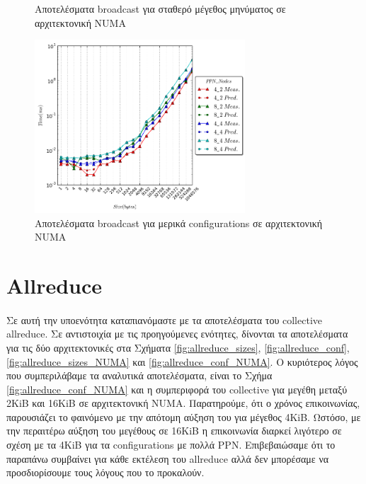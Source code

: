 \begin{figure}[H]
    \caption{Αποτελέσματα broadcast για σταθερό μέγεθος μηνύματος σε αρχιτεκτονική NUMA}
        \label{fig:bcast_sizes_NUMA}
\end{figure}
\begin{figure}[ht]
    \centering
     \captionsetup{justification=centering,margin=0cm,font=footnotesize}
    \includegraphics[width=0.7\textwidth]{./images/broadcast_NUMA/bcast.png}
    \caption{Αποτελέσματα broadcast για μερικά configurations σε αρχιτεκτονική NUMA}
    \label{fig:bcast_conf_NUMA}
\end{figure}

\section{Αllreduce}
\paragraph{}
Σε αυτή την υποενότητα καταπιανόμαστε με τα αποτελέσματα του  collective allreduce. Σε αντιστοιχία με τις προηγούμενες ενότητες, δίνονται τα αποτελέσματα για τις δύο αρχιτεκτονικές στα Σχήματα \ref{fig:allreduce_sizes}, \ref{fig:allreduce_conf}, \ref{fig:allreduce_sizes_NUMA} και \ref{fig:allreduce_conf_NUMA}. Ο κυριότερος λόγος που συμπεριλάβαμε τα αναλυτικά αποτελέσματα, είναι το Σχήμα \ref{fig:allreduce_conf_NUMA} και η συμπεριφορά του collective για μεγέθη μεταξύ 2KiB και 16KiB σε αρχιτεκτονική NUMA. Παρατηρούμε, ότι ο χρόνος επικοινωνίας, παρουσιάζει το φαινόμενο με την απότομη αύξηση του για μέγεθος 4KiB. Ωστόσο, με την περαιτέρω αύξηση του μεγέθους σε 16KiB η επικοινωνία διαρκεί λιγότερο σε σχέση με τα 4KiB για τα configurations με πολλά PPN. Επιβεβαιώσαμε ότι το παραπάνω συμβαίνει για κάθε εκτέλεση του allreduce αλλά δεν μπορέσαμε να προσδιορίσουμε τους λόγους που το προκαλούν. 

